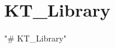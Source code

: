 \chapter{KT\+\_\+\+Library}
\hypertarget{index}{}\label{index}
\label{index_md__c_1_2projet_01bibliotheque_2_k_t___library_2_r_e_a_d_m_e}%
%
 "{}\# KT\+\_\+\+Library"{} 